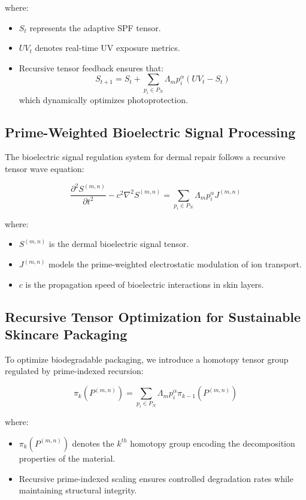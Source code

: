 \documentclass{article}
\theoremstyle{plain}
\theoremstyle{claimstyle}
\begin{document}
where:
\begin{itemize}
    \item \( S_t \) represents the adaptive SPF tensor.
    \item \( UV_t \) denotes real-time UV exposure metrics.
    \item Recursive tensor feedback ensures that:
    \begin{equation}
        S_{t+1} = S_t + \sum_{p_i \in P_N} \Lambda_m p_i^{\alpha} \left( UV_t - S_t \right)
    \end{equation}
    which dynamically optimizes photoprotection.
\end{itemize}

\subsection{Prime-Weighted Bioelectric Signal Processing}
The bioelectric signal regulation system for dermal repair follows a recursive tensor wave equation:

\begin{equation}
\frac{\partial^2 S^{(m,n)}}{\partial t^2} - c^2 \nabla^2 S^{(m,n)} = \sum_{p_i \in P_N} \Lambda_m p_i^{\alpha} J^{(m,n)}
\end{equation}

where:
\begin{itemize}
    \item \( S^{(m,n)} \) is the dermal bioelectric signal tensor.
    \item \( J^{(m,n)} \) models the prime-weighted electrostatic modulation of ion transport.
    \item \( c \) is the propagation speed of bioelectric interactions in skin layers.
\end{itemize}

\subsection{Recursive Tensor Optimization for Sustainable Skincare Packaging}
To optimize biodegradable packaging, we introduce a homotopy tensor group regulated by prime-indexed recursion:

\begin{equation}
\pi_k (P^{(m,n)}) = \sum_{p_i \in P_N} \Lambda_m p_i^{\alpha} \pi_{k-1} (P^{(m,n)})
\end{equation}

where:
\begin{itemize}
    \item \( \pi_k (P^{(m,n)}) \) denotes the \( k^{th} \) homotopy group encoding the decomposition properties of the material.
    \item Recursive prime-indexed scaling ensures controlled degradation rates while maintaining structural integrity.
\end{itemize}
\end{document}
